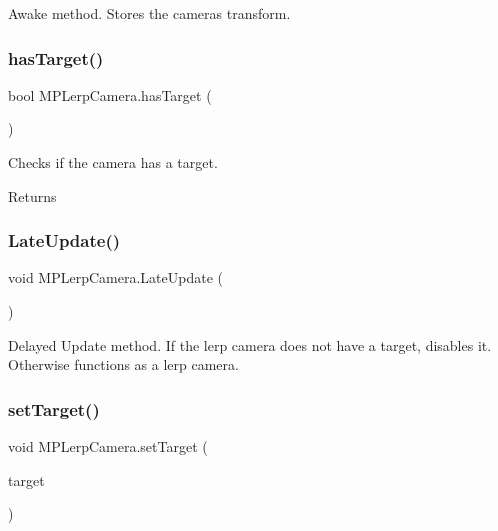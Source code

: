 Awake method. Stores the camera\textquotesingle{}s transform. 

\mbox{\label{class_m_p_lerp_camera_a9f0745c8f677c1ad470dee1e06aee457}} 
\subsubsection{\texorpdfstring{has\+Target()}{hasTarget()}}
{\footnotesize\ttfamily bool M\+P\+Lerp\+Camera.\+has\+Target (\begin{DoxyParamCaption}{ }\end{DoxyParamCaption})}



Checks if the camera has a target. 

\begin{DoxyReturn}{Returns}

\end{DoxyReturn}
\mbox{\label{class_m_p_lerp_camera_a6e6a8bf08b3f9ca3b93aa47bd8339f3b}} 
\subsubsection{\texorpdfstring{Late\+Update()}{LateUpdate()}}
{\footnotesize\ttfamily void M\+P\+Lerp\+Camera.\+Late\+Update (\begin{DoxyParamCaption}{ }\end{DoxyParamCaption})\hspace{0.3cm}{\ttfamily [private]}}



Delayed Update method. If the lerp camera does not have a target, disables it. Otherwise functions as a lerp camera. 

\mbox{\label{class_m_p_lerp_camera_a1c75492c5d0813ea66cee2c3e98a6904}} 
\subsubsection{\texorpdfstring{set\+Target()}{setTarget()}}
{\footnotesize\ttfamily void M\+P\+Lerp\+Camera.\+set\+Target (\begin{DoxyParamCaption}\item[{Game\+Object}]{target }\end{DoxyParamCaption})}



